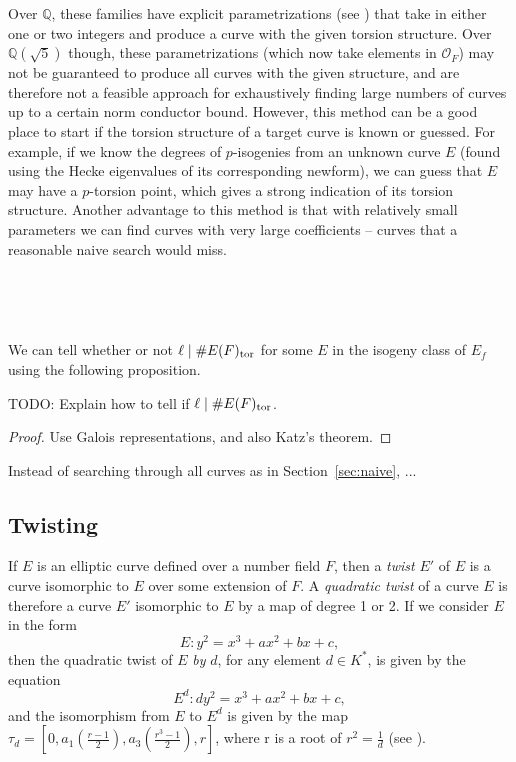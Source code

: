 \documentclass{amsart}
\begin{document}
\noindent Over $\mathbb{Q}$, these families have explicit parametrizations (see \cite{kubert:torfam}) that take in either one or two integers and produce a curve with the given torsion structure. Over $\mathbb{Q}(\sqrt{5})$ though, these parametrizations (which now take elements in $\mathcal{O}_F$) may not be guaranteed to produce all curves with the given structure, and are therefore not a feasible approach for exhaustively finding large numbers of curves up to a certain norm conductor bound. However, this method can be a good place to start if the torsion structure of a target curve is known or guessed. For example, if we know the degrees of $p$-isogenies from an unknown curve $E$ (found using the Hecke eigenvalues of its corresponding newform), we can guess that $E$ may have a $p$-torsion point, which gives a strong indication of its torsion structure. Another advantage to this method is that with relatively small parameters we can find curves with very large coefficients -- curves that a reasonable naive search would miss.

\

\

We can tell whether or not $\ell\mid \#E(F)_{\operatorname{tor}}$ for some
$E$ in the isogeny class of $E_f$ using the following proposition.

\begin{proposition}
 TODO: Explain how to tell if $\ell\mid \#E(F)_{\operatorname{tor}}$.
\end{proposition}
\begin{proof}
  Use Galois representations, and also Katz's theorem.
\end{proof}

Instead of searching through all curves as in Section~\ref{sec:naive},
...


\subsection{Twisting}

If $E$ is an elliptic curve defined over a number field $F$, then a \emph{twist} $E'$ of $E$ is a curve isomorphic to $E$ over some extension of $F$. A \emph{quadratic twist} of a curve $E$ is therefore a curve $E'$ isomorphic to $E$ by a map of degree 1 or 2. If we consider $E$ in the form
\begin{equation}
E:   y^2 = x^3 + ax^2 + bx + c, \nonumber
\end{equation}
then the quadratic twist of $E$ \emph{by} $d$, for any element $d \in K^*$, is given by the equation
\begin{equation}
E^d:   dy^2 = x^3 + ax^2 + bx + c, \nonumber
\end{equation}
and the isomorphism from $E$ to $E^d$ is given by the map $\tau_d = [0, a_1(\frac{r-1}{2}), a_3(\frac{r^3-1}{2}), r]$, where r is a root of $r^2 = \frac{1}{d}$ (see \cite{connell:handbook}).
\end{document}
